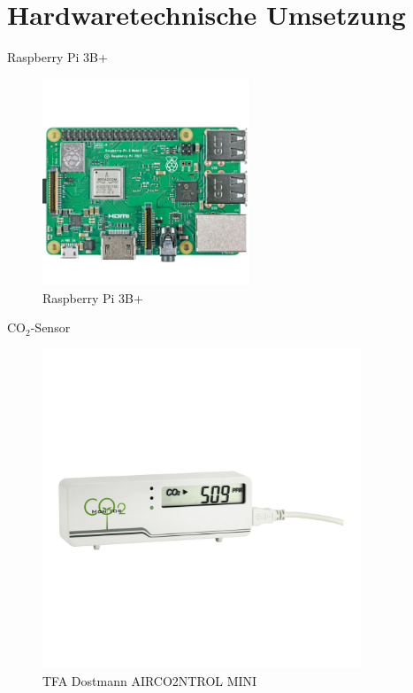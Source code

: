 \documentclass[10pt,ngerman]{beamer}
\begin{document}
\section{Hardwaretechnische Umsetzung}

\begin{frame}[fragile]{Raspberry Pi 3B+}
  \begin{figure}
    \centering
    \captionsetup{justification=centering}
    \includegraphics[width=0.55\textwidth]{pictures/RasPi.png}
    \caption{Raspberry Pi 3B+ \autocite{rasPi}}
  \end{figure}
\end{frame}

\begin{frame}[fragile]{CO$_2$-Sensor}
  \begin{figure}
    \centering
    \captionsetup{justification=centering}
    \includegraphics[trim={0 10cm 0 10cm},clip,width=0.85\textwidth]{pictures/co2monitor.png}
    \caption{TFA Dostmann AIRCO2NTROL MINI \autocite{co2monitor}}
  \end{figure}
\end{frame}
\end{document}
